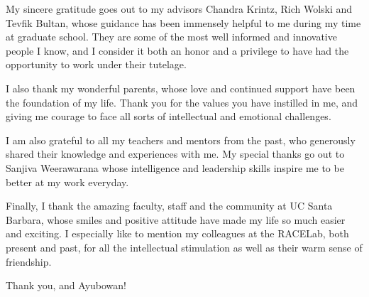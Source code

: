 \begin{acknowledgements}

My sincere gratitude goes out to my advisors Chandra Krintz, Rich Wolski and Tevfik Bultan, whose guidance has been
immensely helpful to me during my time at graduate school. They are some of the most well informed
and innovative people I know, and I consider it both an honor and a privilege to have had the opportunity
to work under their tutelage. 

I also thank my wonderful parents, whose love and continued support have been the foundation of my
life. Thank you for the values you have instilled in me, and giving me courage to face all sorts of
intellectual and emotional challenges. 

I am also grateful to all my teachers and mentors from the past, who generously shared their knowledge
and experiences with me. My special thanks go out to Sanjiva Weerawarana whose intelligence
and leadership skills inspire me to be better at my work everyday. 

Finally, I thank the amazing faculty, staff and the community at UC Santa Barbara, whose smiles and 
positive attitude have made my life so much easier and exciting. I especially like to mention my colleagues
at the RACELab, both present and past, for all the intellectual stimulation as well as their warm sense of
friendship. 

Thank you, and Ayubowan!

\end{acknowledgements} 